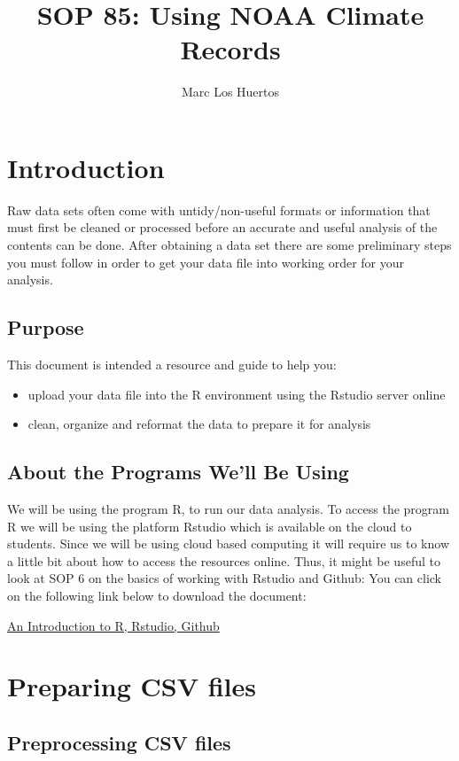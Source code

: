 \documentclass{article}\usepackage[]{graphicx}\usepackage[]{color}
\title{SOP 85: Using NOAA Climate Records}
\author{Marc Los Huertos}
\begin{document}
\maketitle

\section{Introduction}
Raw data sets often come with untidy/non-useful formats or information that must first be cleaned or processed before an accurate and useful analysis of the contents can be done. After obtaining a data set there are some preliminary steps you must follow in order to get your data file into working order for your analysis. 

\subsection{Purpose}

This document is intended a resource and guide to help you: 
\begin{itemize}
\item upload your data file into the R environment using the Rstudio server online
\item clean, organize and reformat the data to prepare it for analysis
\end{itemize}

\subsection{About the Programs We'll Be Using}
We will be using the program R, to run our data analysis. To access the program R we will be using the platform Rstudio which is available on the cloud to students. Since we will be using cloud based computing it will require us to know a little bit about how to access the resources online. Thus, it might be useful to look at SOP 6 on the basics of working with Rstudio and Github: You can click on the following link below to download the document:

\href{https://github.com/marclos/SOPs/raw/master/06_Rstudio_Github/Rstudio-and-Github_v03.pdf}{An Introduction to R, Rstudio, Github}

\section{Preparing CSV files}

\subsection{Preprocessing CSV files}
\end{document}
